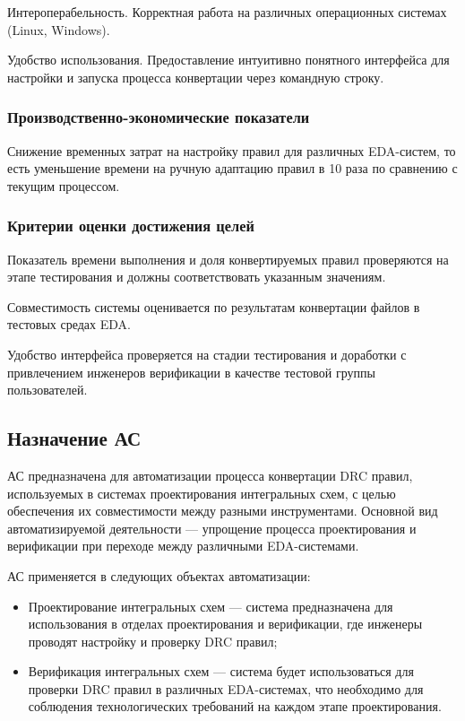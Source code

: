 Интероперабельность.
Корректная работа на различных операционных системах (Linux, Windows).

Удобство использования.
Предоставление интуитивно понятного интерфейса для настройки
и запуска процесса конвертации через командную строку.

\subsubsection{Производственно-экономические показатели}

Снижение временных затрат на настройку правил для различных EDA-систем,
то есть уменьшение времени на ручную адаптацию правил в 10 раза
по сравнению с текущим процессом.

\subsubsection{Критерии оценки достижения целей}

Показатель времени выполнения
и доля конвертируемых правил проверяются на этапе тестирования
и должны соответствовать указанным значениям.

Совместимость системы оценивается
по результатам конвертации файлов в тестовых средах EDA.

Удобство интерфейса проверяется на стадии тестирования
и доработки с привлечением инженеров верификации
в качестве тестовой группы пользователей.

\subsection{Назначение АС}

АС предназначена для автоматизации процесса конвертации DRC правил,
используемых в системах проектирования интегральных схем,
с целью обеспечения их совместимости между разными инструментами.
Основной вид автоматизируемой деятельности --- упрощение процесса
проектирования и верификации при переходе между различными EDA-системами.

АС применяется в следующих объектах автоматизации:

\begin{itemize}
	\item Проектирование интегральных схем --- система предназначена
		для использования в отделах проектирования и верификации,
		где инженеры проводят настройку и проверку DRC правил;
	\item Верификация интегральных схем --- система будет использоваться
		для проверки DRC правил в различных EDA-системах,
		что необходимо для соблюдения технологических требований
		на каждом этапе проектирования.
\end{itemize}

